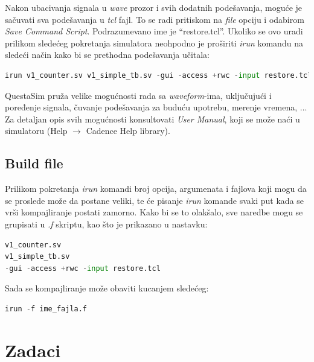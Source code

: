 Nakon ubacivanja signala u \emph{wave} prozor i svih dodatnih podešavanja,
moguće je sačuvati sva podešavanja u \emph{tcl} fajl. To se radi pritiskom na \emph{file}
opciju i odabirom \emph{Save Command Script}.
Podrazumevano ime je ``restore.tcl''. Ukoliko se ovo uradi prilikom sledećeg
pokretanja simulatora neohpodno je proširiti \emph{irun} komandu na sledeći
način kako bi se prethodna podešavanja učitala:

\begin{lstlisting}[language=Python]
irun v1_counter.sv v1_simple_tb.sv -gui -access +rwc -input restore.tcl
\end{lstlisting}

QuestaSim pruža velike mogućnosti rada sa \emph{waveform}-ima, uključujući i
poređenje signala, čuvanje podešavanja za buduću upotrebu, merenje vremena, ...
Za detaljan opis svih mogućnosti konsultovati \emph{User Manual}, koji se može
naći u simulatoru (Help \(\rightarrow\) Cadence Help library).

\subsection{Build file}

Prilikom pokretanja \emph{irun} komandi broj opcija, argumenata i fajlova koji mogu da se proslede
može da postane veliki, te će pisanje \emph{irun} komande svaki put kada se vrši kompajliranje
postati zamorno. Kako bi se to olakšalo, sve naredbe mogu se grupisati u \emph{.f} skriptu, kao što
je prikazano u nastavku:

\begin{lstlisting}[language=Python]
v1_counter.sv
v1_simple_tb.sv
-gui -access +rwc -input restore.tcl
\end{lstlisting}

Sada se kompajliranje može obaviti kucanjem sledećeg:

\begin{lstlisting}[language=Python]
irun -f ime_fajla.f
\end{lstlisting}



\section{Zadaci}

